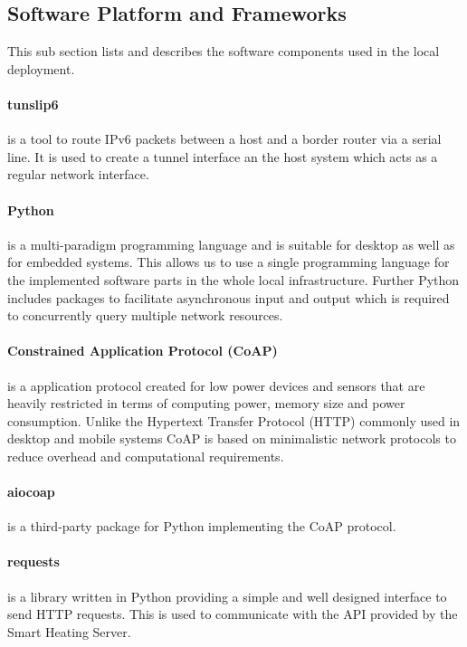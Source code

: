 \subsection{Software Platform and Frameworks}

This sub section lists and describes the software components used in the local deployment.

\paragraph{tunslip6} is a tool to route IPv6 packets between a host and a border router via a serial line.
It is used to create a tunnel interface an the host system which acts as a regular network interface.

\paragraph{Python} is a multi-paradigm programming language and is suitable for desktop as well as for embedded systems.
This allows us to use a single programming language for the implemented software parts in the whole local infrastructure.
Further Python includes packages to facilitate asynchronous input and output which is required to concurrently query multiple network resources.

\paragraph{Constrained Application Protocol (CoAP)} \cite{rfc7252} is a application protocol created for low power devices and sensors that are heavily restricted in terms of computing power, memory size and power consumption.
Unlike the Hypertext Transfer Protocol (HTTP) commonly used in desktop and mobile systems CoAP is based on minimalistic network protocols to reduce overhead and computational requirements.

\paragraph{aiocoap} is a third-party package for Python implementing the CoAP protocol.

\paragraph{requests} is a library written in Python providing a simple and well designed interface to send HTTP requests.
This is used to communicate with the API provided by the Smart Heating Server.

